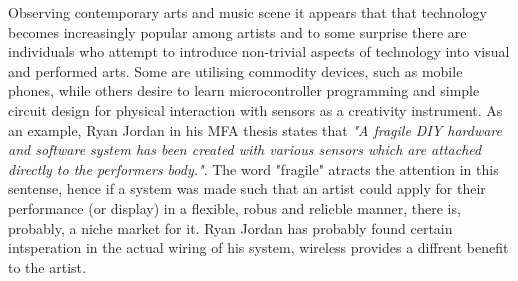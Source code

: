  Observing contemporary arts and music scene it appears that
 that technology becomes increasingly popular among artists
 and to some surprise there are individuals who attempt to
 introduce non-trivial aspects of technology into visual and
 performed arts. Some are utilising commodity devices, such
 as mobile phones, while others desire to learn microcontroller
 programming and simple circuit design for physical interaction
 with sensors as a creativity instrument.
  As an example, Ryan Jordan in his MFA thesis \cite{paper:ryan09}
 states that \emph{"A fragile DIY hardware and software system has
 been created with various sensors which are attached directly to
 the performers body."}. The word "fragile" atracts the attention
 in this sentense, hence if a system was made such that an artist
 could apply for their performance (or display) in a flexible,
 robus and relieble manner, there is, probably, a niche market
 for it. Ryan Jordan has probably found certain intsperation in
 the actual wiring of his system, wireless provides a diffrent
 benefit to the artist.


